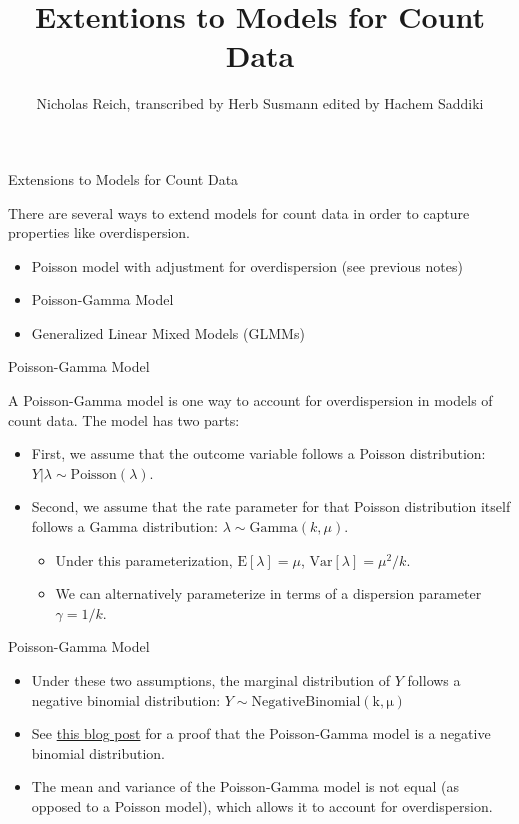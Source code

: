 \documentclass[ignorenonframetext,]{beamer}
\title{Extentions to Models for Count Data}
\author{Nicholas Reich, transcribed by Herb Susmann edited by Hachem Saddiki}
\date{}
\providecommand{\tightlist}{%
  \setlength{\itemsep}{0pt}\setlength{\parskip}{0pt}}
\begin{document}
\frame{\titlepage}

\begin{frame}{Extensions to Models for Count Data}
\protect\hypertarget{extensions-to-models-for-count-data}{}

There are several ways to extend models for count data in order to
capture properties like overdispersion.

\begin{itemize}
\tightlist
\item
  Poisson model with adjustment for overdispersion (see previous notes)
\item
  Poisson-Gamma Model
\item
  Generalized Linear Mixed Models (GLMMs)
\end{itemize}

\end{frame}

\begin{frame}{Poisson-Gamma Model}
\protect\hypertarget{poisson-gamma-model}{}

A Poisson-Gamma model is one way to account for overdispersion in models
of count data. The model has two parts:

\begin{itemize}
\tightlist
\item
  First, we assume that the outcome variable follows a Poisson
  distribution: \(Y | \lambda \sim \mathrm{Poisson}(\lambda)\).
\item
  Second, we assume that the rate parameter for that Poisson
  distribution itself follows a Gamma distribution:
  \(\lambda \sim \mathrm{Gamma}(k, \mu)\).

  \begin{itemize}
  \tightlist
  \item
    Under this parameterization, \(\mathrm{E}[\lambda] = \mu\),
    \(\mathrm{Var}[\lambda] = \mu^2/k\).
  \item
    We can alternatively parameterize in terms of a dispersion parameter
    \(\gamma = 1/k\).
  \end{itemize}
\end{itemize}

\end{frame}

\begin{frame}{Poisson-Gamma Model}
\protect\hypertarget{poisson-gamma-model-1}{}

\begin{itemize}
\item
  Under these two assumptions, the marginal distribution of \(Y\)
  follows a negative binomial distribution:
  \(Y \sim \mathrm{NegativeBinomial(k,\mu)}\)
\item
  See
  \href{https://probabilityandstats.wordpress.com/tag/poisson-gamma-mixture/}{this
  blog post} for a proof that the Poisson-Gamma model is a negative
  binomial distribution.
\item
  The mean and variance of the Poisson-Gamma model is not equal (as
  opposed to a Poisson model), which allows it to account for
  overdispersion.
\end{itemize}

\end{frame}
\end{document}
